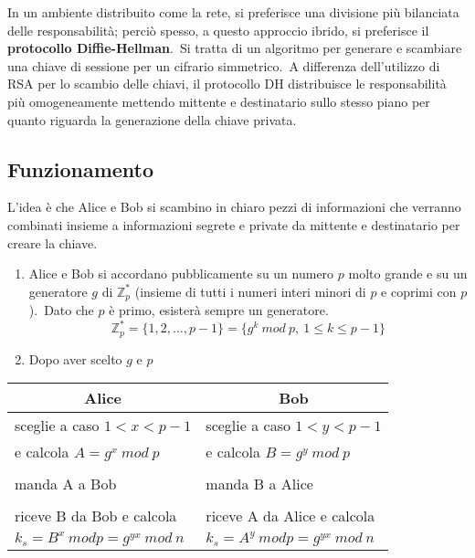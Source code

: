 In un ambiente distribuito come la rete, si preferisce una divisione più bilanciata delle responsabilità; perciò spesso, a questo approccio ibrido, si preferisce il \textbf{protocollo Diffie-Hellman}.\
Si tratta di un algoritmo per generare e scambiare una chiave di sessione per un cifrario simmetrico.\
A differenza dell'utilizzo di RSA per lo scambio delle chiavi, il protocollo DH distribuisce le responsabilità più omogeneamente mettendo mittente e destinatario sullo stesso piano per quanto riguarda la generazione della chiave privata.\

\subsection{Funzionamento}

L'idea è che Alice e Bob si scambino in chiaro pezzi di informazioni che verranno combinati insieme a informazioni segrete e private da mittente e destinatario per creare la chiave.\

\begin{enumerate}
    \item Alice e Bob si accordano pubblicamente su un numero $p$ molto grande e su un generatore $g$ di $\mathbb{Z}_p^*$ (insieme di tutti i numeri interi minori di $p$ e coprimi con $p$).\ Dato che $p$ è primo, esisterà sempre un generatore.\
          \[\mathbb{Z}_p^* = \{1,2,\dots, p-1\} = \{ g^k\ \mathit{mod}\ p,\  1\leq k\leq p-1\}\]
    \item Dopo aver scelto $g$ e $p$
\end{enumerate}

\begin{table}[H]
    \centering
    \begin{tabular}{l|l}
        \multicolumn{1}{c}{Alice}                             & \multicolumn{1}{c}{Bob}                               \\\hline
        sceglie a caso $1< x < p-1$                           & sceglie a caso $1< y < p-1$                           \\
        e calcola  $A = g^x\ \mathit{mod}\ p$                 & e calcola  $B = g^y\ \mathit{mod}\ p$                 \\
                                                              &                                                       \\
        manda A a Bob                                         & manda B a Alice                                       \\
                                                              &                                                       \\
        riceve B da Bob e calcola                             & riceve A da Alice e calcola                           \\
        $k_s = B^x\ \mathit{mod} p = g^{yx}\ \mathit{mod}\ n$ & $k_s = A^y\ \mathit{mod} p = g^{yx}\ \mathit{mod}\ n$ \\
    \end{tabular}
\end{table}

